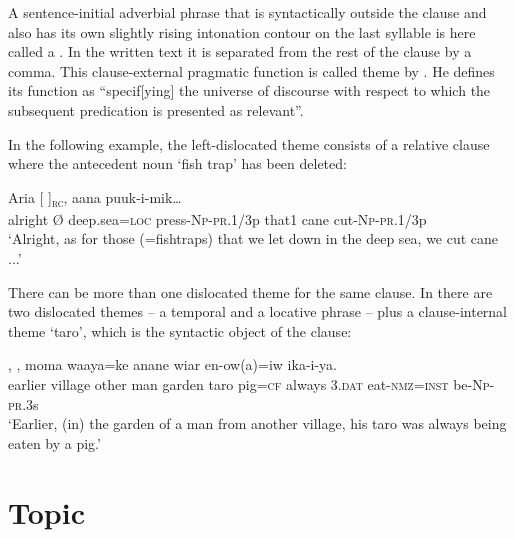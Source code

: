 A sentence-initial adverbial phrase that is syntactically outside the clause and also has its own slightly rising intonation contour on the last syllable is here called a . In the written text it is separated from the rest of the clause by a comma. This clause-external pragmatic function is called theme by \citet[19]{Dik1978}. He defines its function as ``specif[ying] the universe of discourse with respect to which the subsequent predication is presented as relevant''.

 In the following example, the left-dislocated theme consists of a relative clause where the antecedent noun  `fish trap' has been deleted:

\ea%
\label{ex:9:x1704}
\gll Aria  [\textstyleEmphasizedVernacularWords{{\O}}    ]\textsubscript{\textsc{rc}}, aana puuk-i-mik{\dots}\\
alright {\O} deep.sea=\textsc{loc} press-\textsc{Np}-\textsc{pr}.1/3p that1 cane cut-\textsc{Np}-\textsc{pr}.1/3p\\
\glt`Alright, as for those (=fishtraps) that we let down in the deep sea, we cut cane ...'
\z


There can be more than one dislocated theme for the same clause. In  there are two dislocated themes -- a temporal and a locative phrase -- plus a clause-internal theme  `taro', which is the syntactic object of the clause:

\ea%
\label{ex:9:x1700}
\gll {},      , moma  waaya=ke  anane  wiar  en-ow(a)=iw  ika-i-ya.\\
earlier  village  other  man  garden  taro pig=\textsc{cf}  always  3.\textsc{dat}  eat-\textsc{nmz}=\textsc{inst}  be-\textsc{Np}-\textsc{pr}.3s      \\
\glt`Earlier, (in) the garden of a man from another village, his taro was always being eaten by a pig.'
\z


\section{Topic} 

